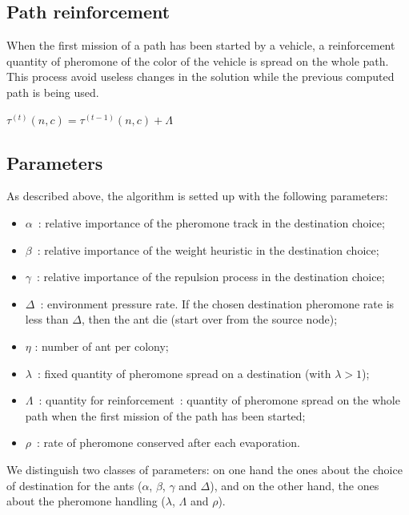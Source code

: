 \documentclass[a4paper,10pt]{article}
\begin{document}
\subsection{Path reinforcement}
When the first mission of a path has been started by a vehicle, a reinforcement quantity of pheromone of the color of the vehicle is spread on the whole path. This process avoid useless changes in the solution while the previous computed path is being used.


\begin{algorithm}
\label{algoReinforcement}
\begin{algorithmic} 
\STATE $\tau^{(t)}(n,c) =  \tau^{(t-1)}(n,c) + \Lambda$
\ENDFOR
\end{algorithmic}
\end{algorithm}

\subsection{Parameters}
As described above, the algorithm is setted up with the following parameters:

\begin{itemize}
 \item $\alpha$ : relative importance of the pheromone track in the destination choice;
 \item $\beta$ :  relative importance of the weight heuristic in the destination choice;
 \item $\gamma$ : relative importance of the repulsion process in the destination choice;
 \item $\Delta$ : environment pressure rate. If the chosen destination pheromone rate is less than $\Delta$, then the ant die (start over from the source node);
 \item $\eta$ : number of ant per colony;
 \item $\lambda$ : fixed quantity of pheromone spread on a destination (with $\lambda > 1$);
 \item $\Lambda$ : quantity for reinforcement : quantity of pheromone spread on the whole path when the first mission of the path has been started;
 \item $\rho$ : rate of pheromone conserved after each evaporation.
\end{itemize}

We distinguish two classes of parameters: on one hand the ones about the choice of destination for the ants ($\alpha$, $\beta$, $\gamma$ and $\Delta$), and on the other hand, the ones about the pheromone handling ($\lambda$, $\Lambda$ and $\rho$).
\end{document}
